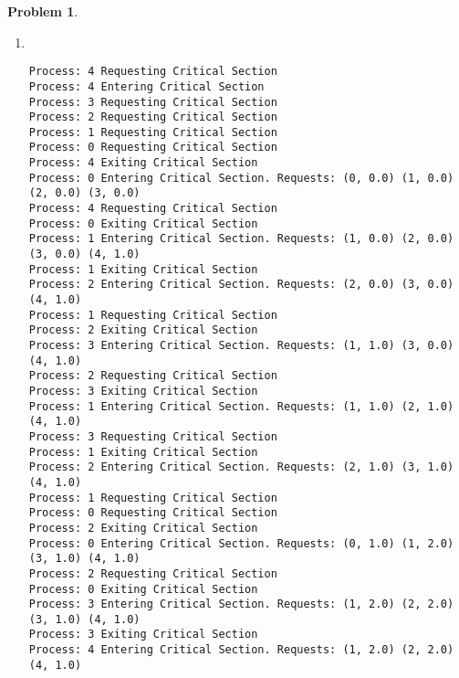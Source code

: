 \documentclass{article}
\theoremstyle{problemstyle}
\newtheorem{problem}{Problem}
\begin{document}
\begin{problem}
\begin{enumerate}[label=(\alph*)]
\begin{lstlisting}
Process: 0 Entering Critical Section
Process: 0 Exiting Critical Section
Process: 0 Requesting Critical Section
Process: 0 Entering Critical Section
Process: 0 Exiting Critical Section
Process: 0 Requesting Critical Section
Process: 0 Entering Critical Section
Process: 0 Exiting Critical Section
Process: 0 Requesting Critical Section
Process: 0 Entering Critical Section
Process: 0 Exiting Critical Section
Process: 0 Requesting Critical Section
Process: 0 Entering Critical Section
Process: 0 Exiting Critical Section
Process: 0 Requesting Critical Section
Process: 0 Entering Critical Section
Process: 0 Exiting Critical Section
Process: 0 Requesting Critical Section
Process: 0 Entering Critical Section
Process: 0 Exiting Critical Section
Process: 0 Requesting Critical Section
Process: 0 Entering Critical Section
Process: 0 Exiting Critical Section
Process: 0 Requesting Critical Section
Process: 0 Entering Critical Section
Process: 0 Exiting Critical Section
\end{lstlisting}
	\item ~
\begin{lstlisting}
Process: 4 Requesting Critical Section
Process: 4 Entering Critical Section
Process: 3 Requesting Critical Section
Process: 2 Requesting Critical Section
Process: 1 Requesting Critical Section
Process: 0 Requesting Critical Section
Process: 4 Exiting Critical Section
Process: 0 Entering Critical Section. Requests: (0, 0.0) (1, 0.0) (2, 0.0) (3, 0.0)
Process: 4 Requesting Critical Section
Process: 0 Exiting Critical Section
Process: 1 Entering Critical Section. Requests: (1, 0.0) (2, 0.0) (3, 0.0) (4, 1.0)
Process: 1 Exiting Critical Section
Process: 2 Entering Critical Section. Requests: (2, 0.0) (3, 0.0) (4, 1.0)
Process: 1 Requesting Critical Section
Process: 2 Exiting Critical Section
Process: 3 Entering Critical Section. Requests: (1, 1.0) (3, 0.0) (4, 1.0)
Process: 2 Requesting Critical Section
Process: 3 Exiting Critical Section
Process: 1 Entering Critical Section. Requests: (1, 1.0) (2, 1.0) (4, 1.0)
Process: 3 Requesting Critical Section
Process: 1 Exiting Critical Section
Process: 2 Entering Critical Section. Requests: (2, 1.0) (3, 1.0) (4, 1.0)
Process: 1 Requesting Critical Section
Process: 0 Requesting Critical Section
Process: 2 Exiting Critical Section
Process: 0 Entering Critical Section. Requests: (0, 1.0) (1, 2.0) (3, 1.0) (4, 1.0)
Process: 2 Requesting Critical Section
Process: 0 Exiting Critical Section
Process: 3 Entering Critical Section. Requests: (1, 2.0) (2, 2.0) (3, 1.0) (4, 1.0)
Process: 3 Exiting Critical Section
Process: 4 Entering Critical Section. Requests: (1, 2.0) (2, 2.0) (4, 1.0)

\end{lstlisting}
\end{enumerate}
\end{problem}
\end{document}
